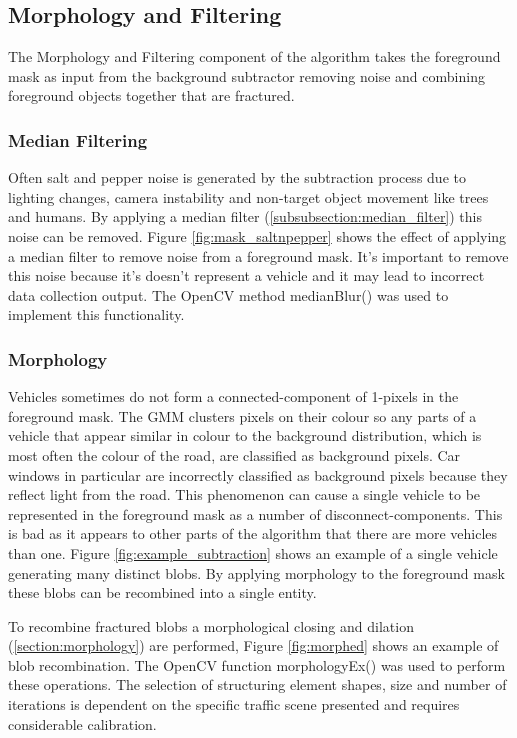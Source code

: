\subsection{Morphology and Filtering}

The Morphology and Filtering component of the algorithm takes the foreground mask as input from the background subtractor removing noise and combining foreground objects together that are fractured. 

\subsubsection{Median Filtering}

Often salt and pepper noise is generated by the subtraction process due to lighting changes, camera instability and non-target object movement like trees and humans. By applying a median filter (\ref{subsubsection:median_filter}) this noise can be removed. Figure \ref{fig:mask_saltnpepper} shows the effect of applying a median filter to remove noise from a foreground mask. It's important to remove this noise because it's doesn't represent a vehicle and it may lead to incorrect data collection output. The OpenCV method medianBlur() was used to implement this functionality.

\subsubsection{Morphology}

Vehicles sometimes do not form a connected-component of 1-pixels in the foreground mask. The GMM clusters pixels on their colour so any parts of a vehicle that appear similar in colour to the background distribution, which is most often the colour of the road, are classified as background pixels. Car windows in particular are incorrectly classified as background pixels because they reflect light from the road. This phenomenon can cause a single vehicle to be represented in the foreground mask as a number of disconnect-components. This is bad as it appears to other parts of the algorithm that there are more vehicles than one. Figure \ref{fig:example_subtraction} shows an example of a single vehicle generating many distinct blobs. By applying morphology to the foreground mask these blobs can be recombined into a single entity.

To recombine fractured blobs a morphological closing and dilation (\ref{section:morphology}) are performed, Figure \ref{fig:morphed} shows an example of blob recombination. The OpenCV function morphologyEx() was used to perform these operations. The selection of structuring element shapes, size and number of iterations is dependent on the specific traffic scene presented and requires considerable calibration. 

